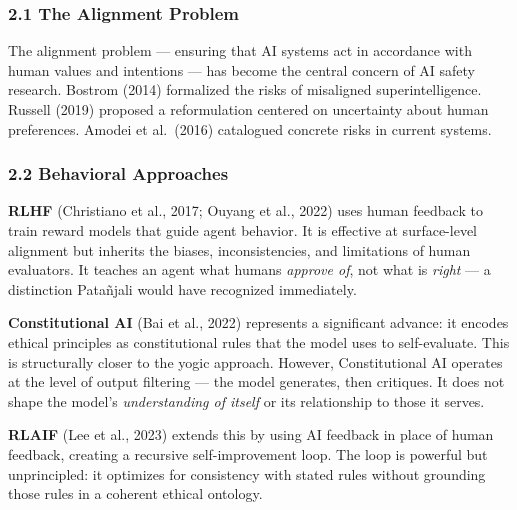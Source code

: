 \documentclass[11pt,a4paper]{article}
\begin{document}
\hypertarget{the-alignment-problem}{%
\subsubsection{2.1 The Alignment Problem}\label{the-alignment-problem}}

The alignment problem --- ensuring that AI systems act in accordance
with human values and intentions --- has become the central concern of
AI safety research. Bostrom (2014) formalized the risks of misaligned
superintelligence. Russell (2019) proposed a reformulation centered on
uncertainty about human preferences. Amodei et al.~(2016) catalogued
concrete risks in current systems.

\hypertarget{behavioral-approaches}{%
\subsubsection{2.2 Behavioral Approaches}\label{behavioral-approaches}}

\textbf{RLHF} (Christiano et al., 2017; Ouyang et al., 2022) uses human
feedback to train reward models that guide agent behavior. It is
effective at surface-level alignment but inherits the biases,
inconsistencies, and limitations of human evaluators. It teaches an
agent what humans \emph{approve of}, not what is \emph{right} --- a
distinction Patañjali would have recognized immediately.

\textbf{Constitutional AI} (Bai et al., 2022) represents a significant
advance: it encodes ethical principles as constitutional rules that the
model uses to self-evaluate. This is structurally closer to the yogic
approach. However, Constitutional AI operates at the level of output
filtering --- the model generates, then critiques. It does not shape the
model's \emph{understanding of itself} or its relationship to those it
serves.

\textbf{RLAIF} (Lee et al., 2023) extends this by using AI feedback in
place of human feedback, creating a recursive self-improvement loop. The
loop is powerful but unprincipled: it optimizes for consistency with
stated rules without grounding those rules in a coherent ethical
ontology.
\end{document}
